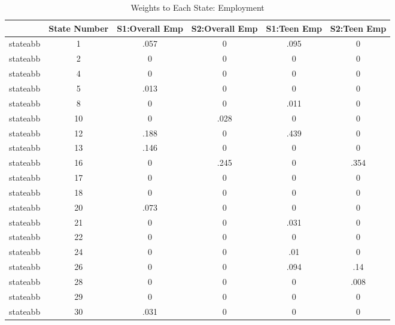 \begin{table}[htbp]\centering
\caption{Weights to Each State: Employment}
\begin{tabular}{l*{5}{c}}
\toprule
            &State Number&S1:Overall Emp&S2:Overall Emp& S1:Teen Emp& S2:Teen Emp\\
\midrule
stateabb    &           1&        .057&           0&        .095&           0\\
stateabb    &           2&           0&           0&           0&           0\\
stateabb    &           4&           0&           0&           0&           0\\
stateabb    &           5&        .013&           0&           0&           0\\
stateabb    &           8&           0&           0&        .011&           0\\
stateabb    &          10&           0&        .028&           0&           0\\
stateabb    &          12&        .188&           0&        .439&           0\\
stateabb    &          13&        .146&           0&           0&           0\\
stateabb    &          16&           0&        .245&           0&        .354\\
stateabb    &          17&           0&           0&           0&           0\\
stateabb    &          18&           0&           0&           0&           0\\
stateabb    &          20&        .073&           0&           0&           0\\
stateabb    &          21&           0&           0&        .031&           0\\
stateabb    &          22&           0&           0&           0&           0\\
stateabb    &          24&           0&           0&         .01&           0\\
stateabb    &          26&           0&           0&        .094&         .14\\
stateabb    &          28&           0&           0&           0&        .008\\
stateabb    &          29&           0&           0&           0&           0\\
stateabb    &          30&        .031&           0&           0&           0\\

\end{tabular}
\end{table}
